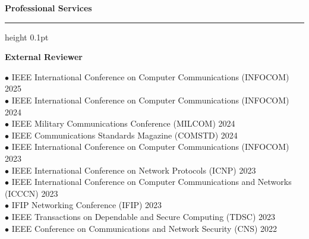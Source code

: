 
{\large\bf Professional Services}
\medskip\hrule height 0.1pt
\vspace{1mm}



\textbf{External Reviewer} \\
\begin{flushleft}
\vspace{-7 mm}

\hspace{1 mm} $\bullet$ \hspace{1 mm} IEEE International Conference on Computer Communications (INFOCOM) \hfill 2025 \\
\hspace{1 mm} $\bullet$ \hspace{1 mm} IEEE International Conference on Computer Communications (INFOCOM) \hfill 2024 \\
\hspace{1 mm} $\bullet$ \hspace{1 mm} IEEE Military Communications Conference (MILCOM) \hfill 2024 \\
\hspace{1 mm} $\bullet$ \hspace{1 mm} IEEE Communications Standards Magazine (COMSTD) \hfill 2024 \\
\hspace{1 mm} $\bullet$ \hspace{1 mm} IEEE International Conference on Computer Communications (INFOCOM)  \hfill 2023 \\
\hspace{1 mm} $\bullet$ \hspace{1 mm} IEEE International Conference on Network Protocols (ICNP) \hfill 2023 \\
\hspace{1 mm} $\bullet$ \hspace{1 mm} IEEE International Conference on Computer Communications and Networks (ICCCN) \hfill 2023 \\
\hspace{1 mm} $\bullet$ \hspace{1 mm} IFIP Networking Conference (IFIP) \hfill 2023 \\
\hspace{1 mm} $\bullet$ \hspace{1 mm} IEEE Transactions on Dependable and Secure Computing (TDSC) \hfill 2023 \\
\hspace{1 mm} $\bullet$ \hspace{1 mm} IEEE Conference on Communications and Network Security (CNS) \hfill 2022 \\



\end{flushleft}	


